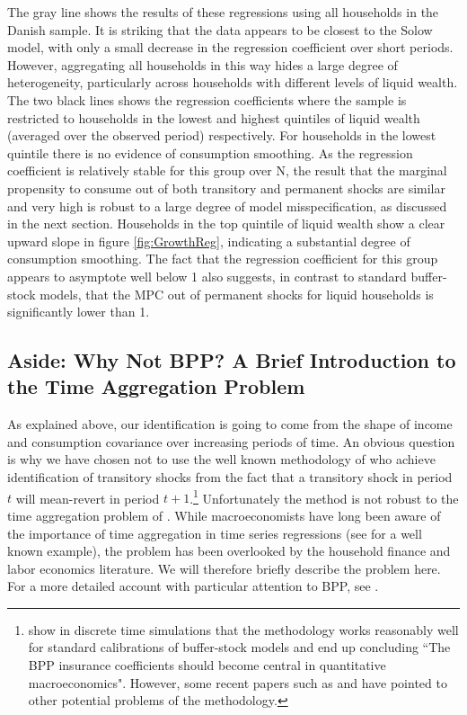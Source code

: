 \documentclass[titlepage]{\econtex}\newcommand{\texname}{ConsumptionHeterogeneity}
\begin{document}
The gray line shows the results of these regressions using all households in the Danish sample. It is striking that the data appears to be closest to the Solow model, with only a small decrease in the regression coefficient over short periods. However, aggregating all households in this way hides a large degree of heterogeneity, particularly across households with different levels of liquid wealth. The two black lines shows the regression coefficients where the sample is restricted to households in the lowest and highest quintiles of liquid wealth (averaged over the observed period) respectively. For households in the lowest quintile there is no evidence of consumption smoothing. As the regression coefficient is relatively stable for this group over N, the result that the marginal propensity to consume out of both transitory and permanent shocks are similar and very high is robust to a large degree of model misspecification, as discussed in the next section. Households in the top quintile of liquid wealth show a clear upward slope in figure \ref{fig:GrowthReg}, indicating a substantial degree of consumption smoothing. The fact that the regression coefficient for this group appears to asymptote well below 1 also suggests, in contrast to standard buffer-stock models, that the MPC out of permanent shocks for liquid households is significantly lower than 1.

\subsection{Aside: Why Not BPP? A Brief Introduction to the Time Aggregation Problem} \label{TimeAgg}
As explained above, our identification is going to come from the shape of income and consumption covariance over increasing periods of time. An obvious question is why we have chosen not to use the well known methodology of \cite{blundell_consumption_2008} who achieve identification of transitory shocks from the fact that a transitory shock in period $t$ will mean-revert in period $t+1$.\footnote{\cite{kaplan_how_2010} show in discrete time simulations that the methodology works reasonably well for standard calibrations of buffer-stock models and end up concluding ``The BPP insurance coefficients should become central in quantitative macroeconomics". However, some recent papers such as \cite{commault_how_2017} and \cite{hryshko_income_2018} have pointed to other potential problems of the methodology.} Unfortunately the method is not robust to the time aggregation problem of \cite{working_note_1960}. While macroeconomists have long been aware of the importance of time aggregation in time series regressions (see \cite{campbell_consumption_1989} for a well known example), the problem has been overlooked by the household finance and labor economics literature. We will therefore briefly describe the problem here. For a more detailed account with particular attention to BPP, see \cite{crawley_time_2018}.
\end{document}
